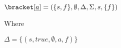 $\bracket[\underline{a}]
=(\{s, f\}, \emptyset,\Delta,\Sigma,s,\{f\})$

Where

$\Delta=\{(s,true,\emptyset,a,f)\}$